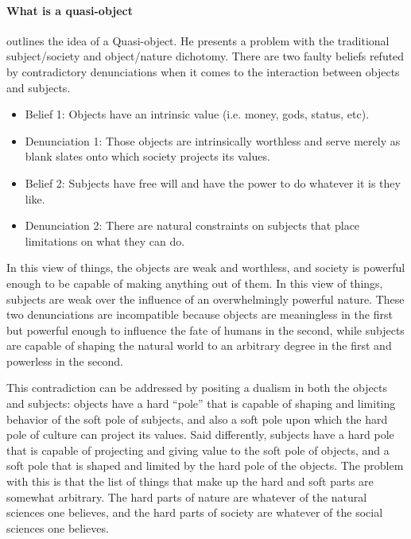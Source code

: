 \documentclass[a4paper]{article}
\begin{document}
\paragraph{What is a quasi-object}

\cite{latour2012we} outlines the idea of a Quasi-object. He presents a problem
with the traditional subject/society and object/nature dichotomy. There are
two faulty beliefs refuted by contradictory denunciations when it comes to the
interaction between objects and subjects.
%
\begin{itemize}
    \item[] Belief 1: Objects have an intrinsic value (i.e. money, gods,
        status, etc).

    \item[] Denunciation 1: Those objects are intrinsically worthless and
        serve merely as blank slates onto which society projects its values.

    \item[] Belief 2: Subjects have free will and have the power to do whatever
        it is they like.

    \item[] Denunciation 2: There are natural constraints on subjects that
        place limitations on what they can do. \end{itemize}
%
In this view of things, the objects are weak and worthless, and society is
powerful enough to be capable of making anything out of them. In this view of
things, subjects are weak over the influence of an overwhelmingly powerful
nature. These two denunciations are incompatible because objects are
meaningless in the first but powerful enough to influence the fate of humans
in the second, while subjects are capable of shaping the natural world to an
arbitrary degree in the first and powerless in the second.

This contradiction can be addressed by positing a dualism in both the objects
and subjects: objects have a hard ``pole'' that is capable of shaping and
limiting behavior of the soft pole of subjects, and also a soft pole upon
which the hard pole of culture can project its values. Said differently,
subjects have a hard pole that is capable of projecting and giving value to
the soft pole of objects, and a soft pole that is shaped and limited by the
hard pole of the objects. The problem with this is that the list of things
that make up the hard and soft parts are somewhat arbitrary. The hard parts of
nature are whatever of the natural sciences one believes, and the hard parts
of society are whatever of the social sciences one believes.
\end{document}

